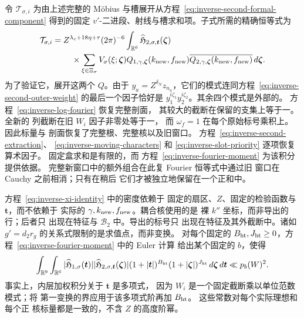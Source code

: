 令 \(\mathcal T_{\sigma,i}\) 为由上述完整的 M\"obius 与槽展开从方程~\eqref{eq:inverse-second-formal-component} 得到的固定 \(v'\)-二进段、射线与槽求和项。子式所需的精确恒等式为
\begin{equation}\label{eq:inverse-xi-identity}
 \begin{split}
 \mathcal T_{\sigma,i}={}&Z^{\lambda_c+18\eta+\tau}(2\pi)^{-6}
 \int_{\mathbb R^6}\widehat{\mathfrak H}_{2,\sigma,\boldsymbol t}
       (\boldsymbol\zeta)\\
 &\quad\times\sum_{\xi\in\Xi_\sigma}V_\sigma(\xi;\boldsymbol\zeta)
 Q_{1,\gamma,\boldsymbol\zeta}(k_{\rm new},f_{\rm new})
 \overline{Q_{2,\gamma,\boldsymbol\zeta}(k_{\rm new},f_{\rm new})}
 \,d\boldsymbol\zeta.
 \end{split}
\end{equation}
为了验证它，展开这两个 \(Q\)。由于
\(y_a=Z^{\delta_N}z_{n_a}\)，它们的模式连同方程~\eqref{eq:inverse-second-outer-weight} 的最后一个因子恰好是
\(y_1^{i\zeta_1}y_2^{i\zeta_2}\)。其余四个模式是外部的。
方程~\eqref{eq:inverse-log-fourier} 恢复完整剖面，
其较大的截断在保留的支集上等于一。全新的
列截断在旧 \(W_i\) 因子非零处等于一，
而 \(\omega_f=1\) 在每个原始标号乘积上。因此标量与
剖面恢复了完整根、完整核以及旧窗口。
方程~\eqref{eq:inverse-second-extraction}、
\eqref{eq:inverse-moving-characters} 和
\eqref{eq:inverse-slot-priority} 逐项恢复算术因子。
固定盒求和是有限的，而
方程~\eqref{eq:inverse-fourier-moment} 为该积分提供依据。
完整新窗口中的额外组合在此复 Fourier 恒等式中通过旧
窗口在 Cauchy 之前相消；只有在稍后
它们才被独立地保留在一个正和中。

方程~\eqref{eq:inverse-xi-identity} 中的密度依赖于
固定的扇区、\(Z\)、固定的检验函数与 \(\boldsymbol t\)，而不依赖于
实际的 \(\gamma,k_{\rm new},f_{\rm new}\)。耦合核使用的是
裸 \(k''\) 坐标，而非导出的行；后者只
出现在特征与 \(\mathcal B_2\) 中。导出的标号只
出现在特征及其外截断中。诸如
\(g'=d_2r_g\) 的关系式限制的是求值点，而非变换。
对每个固定的 \(B_{\rm ht},J_{\rm ht}\ge0\)，方程~\eqref{eq:inverse-fourier-moment} 中的 Euler 计算
给出某个固定的 \(b\)，使得
\begin{equation}\label{eq:inverse-joint-fourier-moments}
 \int_{\mathbb R^9}\int_{\mathbb R^6}
 |\widehat{\mathfrak H}_{1,\sigma}(\boldsymbol t)|
 |\widehat{\mathfrak H}_{2,\sigma,\boldsymbol t}(\boldsymbol\zeta)|
 (1+|\boldsymbol t|)^{B_{\rm ht}}(1+|\boldsymbol\zeta|)^{J_{\rm ht}}
 \,d\boldsymbol\zeta\,d\boldsymbol t\ll p_b(W)^2.
\end{equation}
事实上，内层加权积分关于 \(\boldsymbol t\) 是多项式，
因为 \(W_i\) 是一个固定截断乘以单位范数模式；将
第一变换的界应用于该多项式阶再加 \(B_{\rm ht}\)。
这些常数对每个实际理想和每个正
核标量都是一致的，不含 \(Z\) 的高度阶幂。

